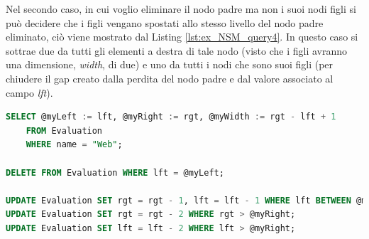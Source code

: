 %
Nel secondo caso, in cui voglio eliminare il nodo padre ma non i suoi nodi figli si può decidere che i figli vengano spostati allo stesso livello del 
nodo padre eliminato, ciò viene mostrato dal Listing \ref{lst:ex_NSM_query4}. In questo caso si sottrae due da tutti gli elementi a destra di tale nodo 
(visto che i figli avranno una dimensione, \textit{width}, di due) e uno da tutti i nodi che sono suoi figli (per chiudere il gap creato dalla perdita 
del nodo padre e dal valore associato al campo \textit{lft}).
\begin{lstlisting}[language=SQL, label=lst:ex_NSM_query4, caption={Query in puro Sql per eliminare un nodo padre dalla tassonomia delle Evaluation, 
    secondo il Nested Set Model.}]
SELECT @myLeft := lft, @myRight := rgt, @myWidth := rgt - lft + 1
    FROM Evaluation
    WHERE name = "Web";

DELETE FROM Evaluation WHERE lft = @myLeft;

UPDATE Evaluation SET rgt = rgt - 1, lft = lft - 1 WHERE lft BETWEEN @myLeft AND @myRight;
UPDATE Evaluation SET rgt = rgt - 2 WHERE rgt > @myRight;
UPDATE Evaluation SET lft = lft - 2 WHERE lft > @myRight;
\end{lstlisting}
%
